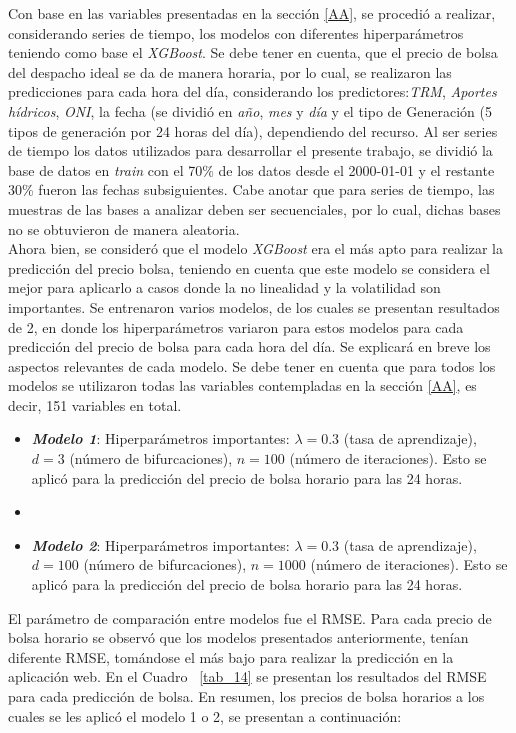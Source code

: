 \documentclass[conference, 10pt]{IEEEtran}
\begin{document}
Con base en las variables presentadas en la sección \ref{AA}, se procedió a realizar, considerando series de tiempo, los modelos con diferentes hiperparámetros teniendo como base el \textit{XGBoost}. Se debe tener en cuenta, que el precio de bolsa del despacho ideal se da de manera horaria, por lo cual, se realizaron las predicciones para cada hora del día, considerando los predictores:\textit{TRM}, \textit{Aportes hídricos}, \textit{ONI}, la fecha (se dividió en \textit{año}, \textit{mes} y \textit{día} y el tipo de Generación (5 tipos de generación por 24 horas del día), dependiendo del recurso. Al ser series de tiempo los datos utilizados para desarrollar el presente trabajo, se dividió la base de datos en \textit{train} con el 70\% de los datos desde el 2000-01-01 y el restante 30\% fueron las fechas subsiguientes. Cabe anotar que para series de tiempo, las muestras de las bases a analizar deben ser secuenciales, por lo cual, dichas bases no se obtuvieron de manera aleatoria.\\
Ahora bien, se consideró que el modelo \textit{XGBoost} era el más apto para realizar la predicción del precio bolsa, teniendo en cuenta que este modelo se considera el mejor para aplicarlo a casos donde la no linealidad y la volatilidad son importantes. Se entrenaron varios modelos, de los cuales se presentan resultados de 2, en donde los hiperparámetros variaron para estos modelos para cada predicción del precio de bolsa para cada hora del día. Se explicará en breve los aspectos relevantes de cada modelo. Se debe tener en cuenta que para todos los modelos se utilizaron todas las variables contempladas en la sección \ref{AA}, es decir, 151 variables en total.

\begin{itemize}
\item \textit{\textbf{Modelo 1}}: Hiperparámetros importantes: $\lambda=0.3$ (tasa de aprendizaje), $d=3$ (número de bifurcaciones), $n=100$ (número de iteraciones). Esto se aplicó para la predicción del precio de bolsa horario para las 24 horas.
\item \item \textit{\textbf{Modelo 2}}: Hiperparámetros importantes: $\lambda=0.3$ (tasa de aprendizaje), $d=100$ (número de bifurcaciones), $n=1000$ (número de iteraciones). Esto se aplicó para la predicción del precio de bolsa horario para las 24 horas.
\end{itemize}

El parámetro de comparación entre modelos fue el RMSE. Para cada precio de bolsa horario se observó que los modelos presentados anteriormente, tenían diferente RMSE, tomándose el más bajo para realizar la predicción en la aplicación web. En el Cuadro ~\ref{tab_14} se presentan los resultados del RMSE para cada predicción de bolsa. En resumen, los precios de bolsa horarios a los cuales se les aplicó el modelo 1 o 2, se presentan a continuación: 
\end{document}
